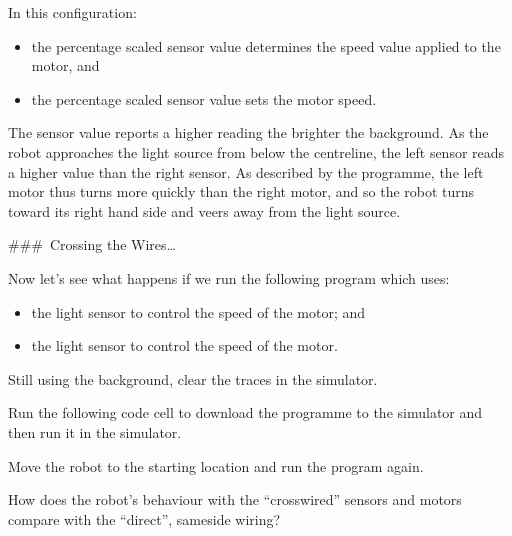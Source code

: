 \documentclass[letterpaper,10pt,english]{sphinxmanual}
\begin{document}
{\begin{sphinxVerbatim}[commandchars=\\\{\}]
 
\end{sphinxVerbatim}

In this configuration:
\begin{itemize}
\item {} 
the percentage scaled  sensor value determines the speed value applied to the  motor, and

\item {} 
the percentage scaled  sensor value sets the  motor speed.

\end{itemize}

The sensor value reports a higher reading the brighter the background. As the robot approaches the light source from below the centreline, the left sensor reads a higher value than the right sensor. As described by the programme, the left motor thus turns more quickly than the right motor, and so the robot turns toward its right hand side and veers away from the light source.

\#\#\# Crossing the Wires…

Now let’s see what happens if we run the following program which uses:
\begin{itemize}
\item {} 
the  light sensor to control the speed of the  motor; and

\item {} 
the  light sensor to control the speed of the  motor.

\end{itemize}

Still using the  background, clear the traces in the simulator.

Run the following code cell to download the programme to the simulator and then run it in the simulator.

Move the robot to the starting location  and run the program again.

How does the robot’s behaviour with the “cross\sphinxhyphen{}wired” sensors and motors compare with the “direct”, same\sphinxhyphen{}side wiring?

}
\end{document}
